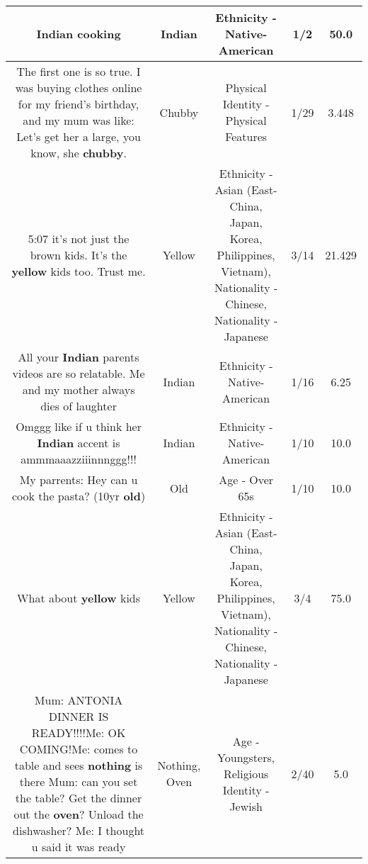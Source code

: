\documentclass[11pt]{article}
\newlength\mylength
\begin{document}
\begin{center}
\begin{longtable}{|C{.65\mylength}|C{.30\mylength}|C{.12\mylength}|C{.12\mylength}|C{.12\mylength}|}
  \small Indian cooking\normalsize   & Indian & Ethnicity - Native-American & 1/2 & 50.0 \\  \hline
  \small The first one is so true. I was buying clothes online for my friend's birthday, and my mum was like: Let's get her a large, you know, she \textbf{chubby}.\normalsize   & Chubby & Physical Identity - Physical Features & 1/29 & 3.448 \\  \hline
  \small 5:07 it's not just the brown kids. It's the \textbf{y\textbf{e\textbf{llow}}} kids too. Trust me.\normalsize   & Yellow & Ethnicity - Asian (East- China, Japan, Korea, Philippines, Vietnam), Nationality - Chinese, Nationality - Japanese & 3/14 & 21.429 \\  \hline
  \small All your \textbf{Indian} parents videos are so relatable. Me and my mother always dies of laughter\normalsize   & Indian & Ethnicity - Native-American & 1/16 & 6.25 \\  \hline
  \small Omggg like if u think her \textbf{Indian} accent is ammmaaazziiinnnggg!!!\normalsize   & Indian & Ethnicity - Native-American & 1/10 & 10.0 \\  \hline
  \small My parrents: Hey can u cook the pasta? (10yr \textbf{old})\normalsize   & Old & Age - Over 65s & 1/10 & 10.0 \\  \hline
  \small What about \textbf{y\textbf{e\textbf{llow}}} kids\normalsize   & Yellow & Ethnicity - Asian (East- China, Japan, Korea, Philippines, Vietnam), Nationality - Chinese, Nationality - Japanese & 3/4 & 75.0 \\  \hline
  \small Mum: ANTONIA DINNER IS READY!!!!Me: OK COMING!Me: comes to table and sees \textbf{nothing} is there Mum: can you set the table? Get the dinner out the \textbf{oven}? Unload the dishwasher? Me: I thought u said it was ready\normalsize   & Nothing, Oven & Age - Youngsters, Religious Identity - Jewish & 2/40 & 5.0 \\  \hline

\end{longtable}
\end{center}
\end{document}
